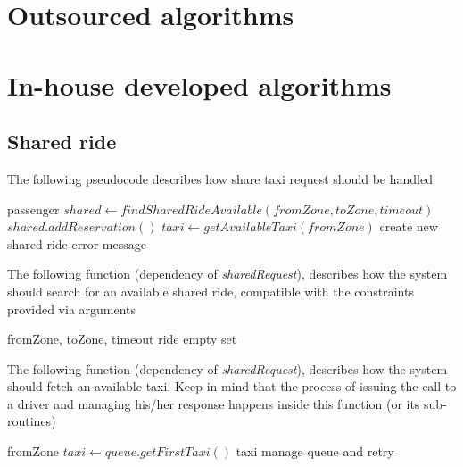 \section{Outsourced algorithms}

\section{In-house developed algorithms}
\subsection{Shared ride}
The following pseudocode describes how share taxi request should be handled
\begin{algorithmic}
  {passenger}
  \State $ shared \gets findSharedRideAvailable(fromZone, toZone, timeout) $
    \State $ shared.addReservation() $
  \Else
    \State $ taxi \gets getAvailableTaxi(fromZone) $
      \State create new shared ride
    \Else
      \State error message
    \EndIf
  \EndIf
 \EndFunction
\end{algorithmic}
The following function (dependency of \textit{sharedRequest}), describes how the system should search for an
available shared ride, compatible with the constraints provided via arguments
\begin{algorithmic}
  {fromZone, toZone, timeout}
	    \State \Return ride
	  \EndIf
	\EndIf
      \EndIf
    \EndIf
  \EndFor
  \State \Return empty set
 \EndFunction
\end{algorithmic}
The following function (dependency of \textit{sharedRequest}), describes how the system should fetch an available taxi.
Keep in mind that the process of issuing the call to a driver and managing his/her response happens inside this function
(or its sub-routines)
\begin{algorithmic}
 {fromZone}
       \State $ taxi \gets queue.getFirstTaxi() $
         \Return taxi
     \Else 
         \State manage queue and retry
    \EndIf
\EndIf
\EndFor
\EndFunction


\end{algorithmic}

